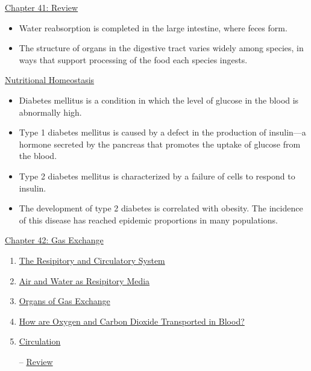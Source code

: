 \documentclass[12pt,letterpaper]{article}
\newcommand{\thetitle}{\hypertarget{home}{Animals and Ecology}}
\begin{document}
\begin{probbox}{\hyperlink{41}{Chapter 41: Review}}
{\begin{itemize}
        \item Water reabsorption is completed in the large intestine, where feces form. 
        \item The structure of organs in the digestive tract varies widely among species, in ways that support processing of the food each species ingests.
    \end{itemize}
    \hyperlink{41.4}{Nutritional Homeostasis}
    \begin{itemize}
        \item Diabetes mellitus is a condition in which the level of glucose in the blood is abnormally high.
        \item Type 1 diabetes mellitus is caused by a defect in the production of insulin—a hormone secreted by the pancreas that promotes the uptake of glucose from the blood.
        \item Type 2 diabetes mellitus is characterized by a failure of cells to respond to insulin.
        \item The development of type 2 diabetes is correlated with obesity. The incidence of this disease has reached epidemic proportions in many populations.
    \end{itemize}
}\end{probbox}



\clearpage

\renewcommand{\thetitle}{\hypertarget{42}{Gas Exchange}}
\hypertarget{42}{}
\setcounter{section}{42}

\begin{chapbox}{\hyperlink{home}{Chapter 42: Gas Exchange}}
    \begin{enumerate}
        \item \hyperlink{42.1}{The Resipitory and Circulatory System}
        \item \hyperlink{42.2}{Air and Water as Resipitory Media}
        \item \hyperlink{42.3}{Organs of Gas Exchange}
        \item \hyperlink{42.4}{How are Oxygen and Carbon Dioxide Transported in Blood?}
        \item \hyperlink{42.5}{Circulation}
        \item [--] \hyperlink{42.r}{Review}
    \end{enumerate}
\end{chapbox}
\end{document}
